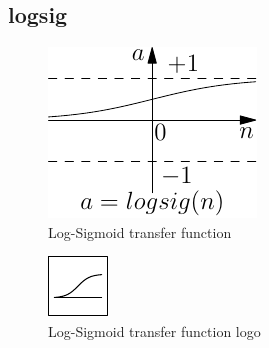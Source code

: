 \subsection{logsig}

\begin{figure}[htb]
\centering
  \includegraphics{octave/neuroToolbox/graphics/logsig}
\caption{Log-Sigmoid transfer function}
\label{fig:logsigTransferFunction}
\end{figure}

\begin{figure}[htb]
\centering
  \includegraphics{octave/neuroToolbox/graphics/logsiglogo}
\caption{Log-Sigmoid transfer function logo}
\label{fig:logsigTransferFunctionLogo}
\end{figure}
